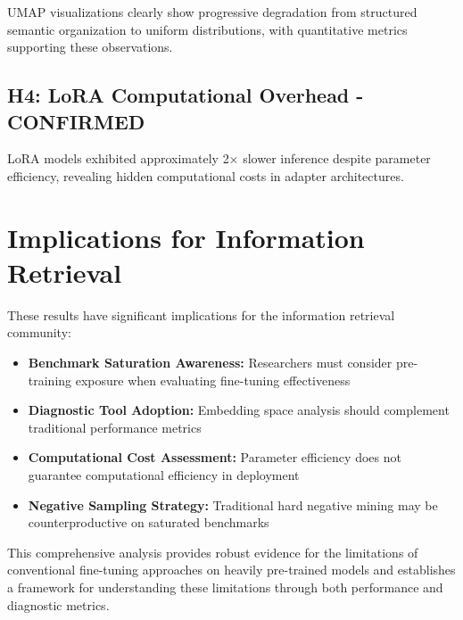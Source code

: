 UMAP visualizations clearly show progressive degradation from structured semantic organization to uniform distributions, with quantitative metrics supporting these observations.

\subsection{H4: LoRA Computational Overhead - CONFIRMED}

LoRA models exhibited approximately 2× slower inference despite parameter efficiency, revealing hidden computational costs in adapter architectures.

\section{Implications for Information Retrieval}

These results have significant implications for the information retrieval community:

\begin{itemize}
\item \textbf{Benchmark Saturation Awareness:} Researchers must consider pre-training exposure when evaluating fine-tuning effectiveness
\item \textbf{Diagnostic Tool Adoption:} Embedding space analysis should complement traditional performance metrics
\item \textbf{Computational Cost Assessment:} Parameter efficiency does not guarantee computational efficiency in deployment
\item \textbf{Negative Sampling Strategy:} Traditional hard negative mining may be counterproductive on saturated benchmarks
\end{itemize}

This comprehensive analysis provides robust evidence for the limitations of conventional fine-tuning approaches on heavily pre-trained models and establishes a framework for understanding these limitations through both performance and diagnostic metrics.
